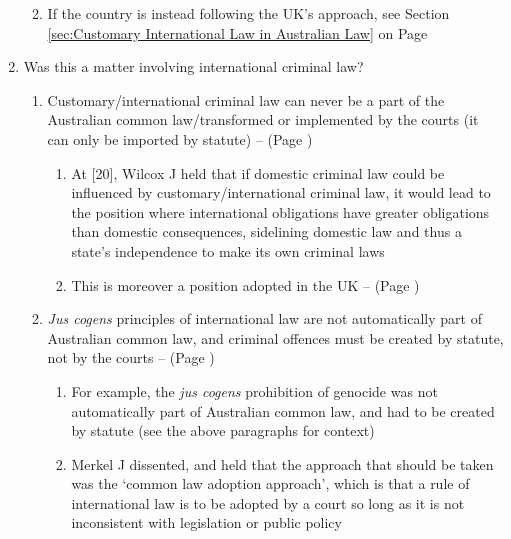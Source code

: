 \begin{enumerate}
\begin{enumerate}
\begin{enumerate}
\begin{enumerate}
            \end{enumerate}
        \end{enumerate}
        \item If the country is instead following the UK's approach, see Section \ref{sec:Customary International Law in Australian Law} on Page \pageref{sec:Customary International Law in Australian Law}
    \end{enumerate}
    \item Was this a matter involving international criminal law?
    \begin{enumerate}
        \item Customary/international criminal law can never be a part of the Australian common law/transformed or implemented by the courts (it can only be imported by statute) --  (Page \pageref{case: Nulyarimanna v Thompson})
        \begin{enumerate}
            \item At [20], Wilcox J held that if domestic criminal law could be influenced by customary/international criminal law, it would lead to the position where international obligations have greater obligations than domestic consequences, sidelining domestic law and thus a state's independence to make its own criminal laws
            \item This is moreover a position adopted in the UK --  (Page \pageref{case: R v Jones})
        \end{enumerate}
        \item \textit{Jus cogens} principles of international law are not automatically part of Australian common law, and criminal offences must be created by statute, not by the courts --  (Page \pageref{case: Nulyarimanna v Thompson})
        \begin{enumerate}
            \item For example, the \textit{jus cogens} prohibition of genocide was not automatically part of Australian common law, and had to be created by statute (see the above paragraphs for context) 
            \item Merkel J dissented, and held that the approach that should be taken was the `common law adoption approach', which is that a rule of international law is to be adopted by a court so long as it is not inconsistent with legislation or public policy

\end{enumerate}
\end{enumerate}
\end{enumerate}
